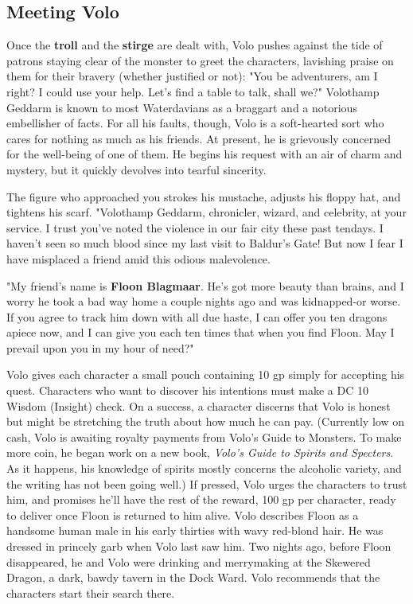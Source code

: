 \documentclass[10pt,a4paper,twoside,twocolumn,openany,nodeprecatedcode]{dndbook}
\begin{document}
\subsection{Meeting Volo}
Once the \textbf{troll} and the \textbf{stirge} are dealt with, Volo pushes against the tide of patrons staying clear of the monster to greet the characters, lavishing praise on them for their bravery (whether justified or not): "You be adventurers, am I right? I could use your help. Let's find a table to talk, shall we?"
Volothamp Geddarm is known to most Waterdavians as a braggart and a notorious embellisher of facts. For all his faults, though, Volo is a soft-hearted sort who cares for nothing as much as his friends. At present, he is grievously concerned for the well-being of one of them. He begins his request with an air of charm and mystery, but it quickly devolves into tearful sincerity.
\begin{DndReadAloud}{}
The figure who approached you strokes his mustache, adjusts his floppy hat, and tightens his scarf. "Volothamp Geddarm, chronicler, wizard, and celebrity, at your service. I trust you've noted the violence in our fair city these past tendays. I haven't seen so much blood since my last visit to Baldur's Gate! But now I fear I have misplaced a friend amid this odious malevolence.

"My friend's name is \textbf{Floon Blagmaar}. He's got more beauty than brains, and I worry he took a bad way home a couple nights ago and was kidnapped-or worse. If you agree to track him down with all due haste, I can offer you ten dragons apiece now, and I can give you each ten times that when you find Floon. May I prevail upon you in my hour of need?"
\end{DndReadAloud}

Volo gives each character a small pouch containing 10 gp simply for accepting his quest. Characters who want to discover his intentions must make a DC 10 Wisdom (Insight) check. On a success, a character discerns that Volo is honest but might be stretching the truth about how much he can pay. (Currently low on cash, Volo is awaiting royalty payments from Volo's Guide to Monsters. To make more coin, he began work on a new book, \textit{Volo's Guide to Spirits and Specters}. As it happens, his knowledge of spirits mostly concerns the alcoholic variety, and the writing has not been going well.) If pressed, Volo urges the characters to trust him, and promises he'll have the rest of the reward, 100 gp per character, ready to deliver once Floon is returned to him alive.
Volo describes Floon as a handsome human male in his early thirties with wavy red-blond hair. He was dressed in princely garb when Volo last saw him. Two nights ago, before Floon disappeared, he and Volo were drinking and merrymaking at the Skewered Dragon, a dark, bawdy tavern in the Dock Ward. Volo recommends that the characters start their search there.
\end{document}
